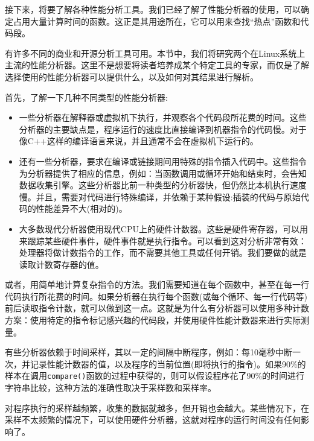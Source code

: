 
接下来，将要了解各种性能分析工具。我们已经了解了性能分析器的使用，可以确定占用大量计算时间的函数。这正是其用途所在，它可以用来查找“热点”函数和代码段。

有许多不同的商业和开源分析工具可用。本节中，我们将研究两个在Linux系统上主流的性能分析器。这里不是想要将读者培养成某个特定工具的专家，而仅是了解选择使用的性能分析器可以提供什么，以及如何对其结果进行解析。

首先，了解一下几种不同类型的性能分析器:

\begin{itemize}
\item 一些分析器在解释器或虚拟机下执行，并观察各个代码段所花费的时间。这些分析器的主要缺点是，程序运行的速度比直接编译到机器指令的代码慢。对于像C++这样的编译语言来说，并且通常不会在虚拟机下运行的。

\item 还有一些分析器，要求在编译或链接期间用特殊的指令插入代码中。这些指令为分析器提供了相应的信息，例如：当函数调用或循环开始和结束时，会告知数据收集引擎。这些分析器比前一种类型的分析器快，但仍然比本机执行速度慢。并且，需要对代码进行特殊编译，并依赖于某种假设:插装的代码与原始代码的性能差异不大(相对的)。

\item 大多数现代分析器使用现代CPU上的硬件计数器。这些是硬件寄存器，可以用来跟踪某些硬件事件，硬件事件就是执行指令。可以看到这对分析非常有效：处理器将做计数指令的工作，而不需要其他工具或任何开销。我们要做的就是读取计数寄存器的值。

\end{itemize}

或者，用简单地计算复杂指令的方法。我们需要知道在每个函数中，甚至在每一行代码执行所花费的时间。如果分析器在执行每个函数(或每个循环、每一行代码等)前后读取指令计数，就可以做到这一点。这就是为什么有分析器可以使用多种计数方案：使用特定的指令标记感兴趣的代码段，并使用硬件性能计数器来进行实际测量。

有些分析器依赖于时间采样，其以一定的间隔中断程序，例如：每10毫秒中断一次，并记录性能计数器的值，以及程序的当前位置(即将执行的指令)。如果90\%的样本在调用\texttt{compare()}函数的过程中获得的，则可以假设程序花了90\%的时间进行字符串比较，这种方法的准确性取决于采样数和采样率。

对程序执行的采样越频繁，收集的数据就越多，但开销也会越大。某些情况下，在采样不太频繁的情况下，可以使用硬件分析器，这就对程序的运行时间没有任何影响了。


